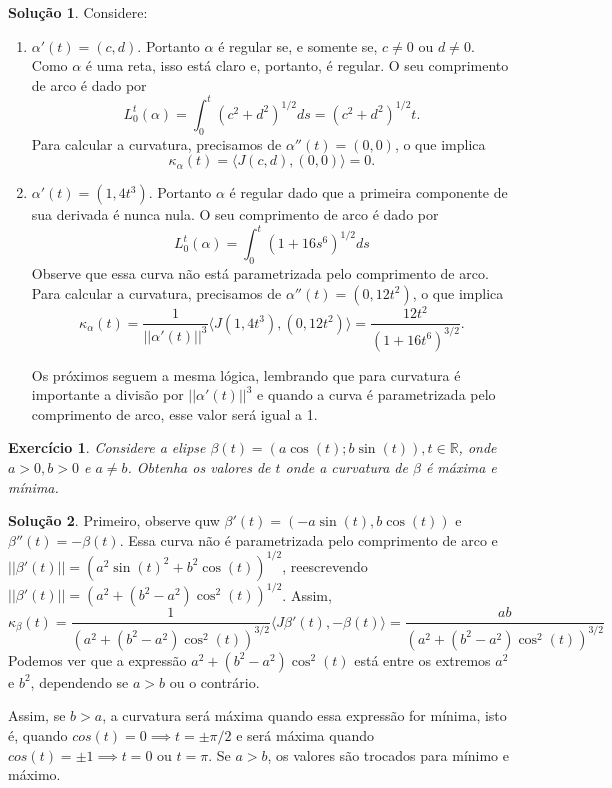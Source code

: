 \documentclass[a4paper,12pt]{article}
\newcommand{\R}{\mathbb{R}}
\theoremstyle{exer}
\newtheorem{exercise}{Exercício}
\theoremstyle{definition}
\newtheorem{solution}{Solução}
\theoremstyle{plain}
\begin{document}
\begin{solution}
    Considere:
    \begin{enumerate}
        \item $\alpha '(t) = (c,d)$. Portanto $\alpha$ é regular se, e somente
        se, $c \neq 0$ ou $d \neq 0$. Como $\alpha$ é uma reta, isso está
        claro e, portanto, é regular. O seu comprimento de arco é dado por
        $$L_0^t(\alpha) = \int_0^t (c^2 + d^2)^{1/2} ds = (c^2 +
        d^2)^{1/2}t.$$
        Para calcular a curvatura, precisamos de $\alpha ''(t) = (0,0)$, o que
        implica 
        $$\kappa_{\alpha}(t) = \langle J(c,d), (0,0) \rangle = 0.$$

        \item $\alpha '(t) = (1,4t^3)$. Portanto $\alpha$ é regular dado que a
        primeira componente de sua derivada é nunca nula. O seu comprimento de arco é dado por
        $$L_0^t(\alpha) = \int_0^t (1 + 16s^6)^{1/2} ds$$
        Observe que essa curva não está parametrizada pelo comprimento de
        arco.  Para calcular a curvatura, precisamos de $\alpha ''(t) = (0,12t^2)$, o que
        implica 
        $$\kappa_{\alpha}(t) = \frac{1}{||\alpha '(t)||^3}\langle J(1,4t^3),
        (0,12t^2) \rangle = \frac{12t^2}{(1 + 16t^6)^{3/2   }}.$$

        Os próximos seguem a mesma lógica, lembrando que para curvatura é
        importante a divisão por $||\alpha '(t)||^3$ e quando a curva é
        parametrizada pelo comprimento de arco, esse valor será igual a 1.
    \end{enumerate}

\end{solution}

\begin{exercise}
    Considere a elipse $\beta(t) = (a\cos(t);b\sin(t)), t \in \R$, onde $a >
    0, b > 0$ e $a \neq b$. Obtenha os valores de $t$ onde a curvatura de
    $\beta$ é máxima e mínima.
\end{exercise}

\begin{solution}
    Primeiro, observe quw $\beta '(t) = (-a\sin(t), b\cos(t))$ e $\beta ''(t)
    = -\beta(t)$. Essa curva não é parametrizada pelo comprimento de
    arco e $||\beta '(t)|| = (a^2\sin(t)^2 + b^2\cos(t))^{1/2}$, reescrevendo
    $||\beta'(t)|| = (a^2 + (b^2 - a^2)\cos^2(t))^{1/2}$. Assim, 
    $$
    \kappa_{\beta}(t) = \frac{1}{ (a^2 + (b^2 - a^2)\cos^2(t))^{3/2}}\langle J\beta '(t), -\beta(t) \rangle = \frac{ab}{(a^2 + (b^2 - a^2)\cos^2(t))^{3/2}}$$
    Podemos ver que a expressão $a^2 + (b^2 - a^2)\cos^2(t)$ está entre os
    extremos $a^2$ e $b^2$, dependendo se $a > b$ ou o contrário. 

    Assim, se $b > a$, a curvatura será máxima quando essa expressão for
    mínima, isto é, quando $cos(t) = 0 \implies t = \pm \pi/2$ e será máxima
    quando $cos(t) = \pm 1 \implies t = 0$ ou $t = \pi$. Se $a > b$, os
    valores são trocados para mínimo e máximo. 
\end{solution}
\end{document}
